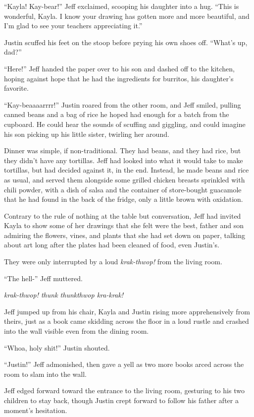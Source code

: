 ``Kayla!  Kay-bear!'' Jeff exclaimed, scooping his daughter into a hug.  ``This is wonderful, Kayla.  I know your drawing has gotten more and more beautiful, and I'm glad to see your teachers appreciating it.''

Justin scuffed his feet on the stoop before prying his own shoes off.  ``What's up, dad?''

``Here!'' Jeff handed the paper over to his son and dashed off to the kitchen, hoping against hope that he had the ingredients for burritos, his daughter's favorite.

``Kay-beaaaarrrr!'' Justin roared from the other room, and Jeff smiled, pulling canned beans and a bag of rice he hoped had enough for a batch from the cupboard.  He could hear the sounds of scuffing and giggling, and could imagine his son picking up his little sister, twirling her around.

Dinner was simple, if non-traditional.  They had beans, and they had rice, but they didn't have any tortillas.  Jeff had looked into what it would take to make tortillas, but had decided against it, in the end.  Instead, he made beans and rice as usual, and served them alongside some grilled chicken breasts sprinkled with chili powder, with a dish of salsa and the container of store-bought guacamole that he had found in the back of the fridge, only a little brown with oxidation.

Contrary to the rule of nothing at the table but conversation, Jeff had invited Kayla to show some of her drawings that she felt were the best, father and son admiring the flowers, vines, and plants that she had set down on paper, talking about art long after the plates had been cleaned of food, even Justin's.

They were only interrupted by a loud \textit{krak-thwop!} from the living room.

``The hell-'' Jeff muttered.

\textit{krak-thwop!  thunk thunkthwop kra-krak!}

Jeff jumped up from his chair, Kayla and Justin rising more apprehensively from theirs, just as a book came skidding across the floor in a loud rustle and crashed into the wall visible even from the dining room.

``Whoa, holy shit!'' Justin shouted.

``Justin!'' Jeff admonished, then gave a yell as two more books arced across the room to slam into the wall.

Jeff edged forward toward the entrance to the living room, gesturing to his two children to stay back, though Justin crept forward to follow his father after a moment's hesitation.

